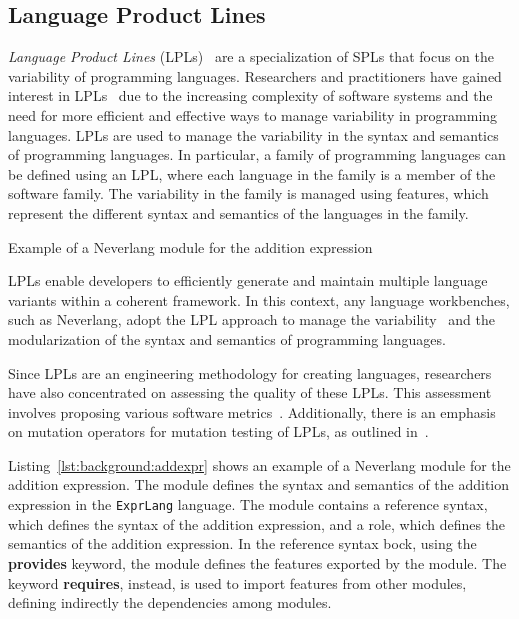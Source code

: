 \subsection{Language Product Lines}\label{subsec:background:LanguageProductLines}

\textit{Language Product Lines} (LPLs)~\cite{Mendez-Acuna16, Cazzola16i, Cazzola15f, Cazzola13g} are a specialization of SPLs that focus on the variability of programming languages. Researchers and practitioners have gained interest in LPLs~\cite{Cazzola17, Ghosh11b, Kuehn14} due to the increasing complexity of software systems and the need for more efficient and effective ways to manage variability in programming languages.
LPLs are used to manage the variability in the syntax and semantics of programming languages. In particular, a family of programming languages can be defined using an LPL, where each language in the family is a member of the software family. The variability in the family is managed using features, which represent the different syntax and semantics of the languages in the family.

\begin{Listing}[t]
    \centering
    \caption{Example of a Neverlang module for the addition expression}
    \label{lst:background:addexpr}
\end{Listing}

LPLs enable developers to efficiently generate and maintain multiple language variants within a coherent framework.
In this context, any language workbenches, such as Neverlang, adopt the LPL approach to manage the variability~\cite{Klint09b, Cazzola13g} and the modularization of the syntax and semantics of programming languages.

Since LPLs are an engineering methodology for creating languages, researchers have also concentrated on assessing the quality of these LPLs. This assessment involves proposing various software metrics~\cite{Cazzola21b}. Additionally, there is an emphasis on mutation operators for mutation testing of LPLs, as outlined in~\cite{Cazzola22b}.

Listing~\ref{lst:background:addexpr} shows an example of a Neverlang module for the addition expression. The module defines the syntax and semantics of the addition expression in the \texttt{ExprLang} language. The module contains a reference syntax, which defines the syntax of the addition expression, and a role, which defines the semantics of the addition expression.
In the reference syntax bock, using the \textbf{provides} keyword, the module defines the features exported by the module. The keyword \textbf{requires}, instead, is used to import features from other modules, defining indirectly the dependencies among modules.

